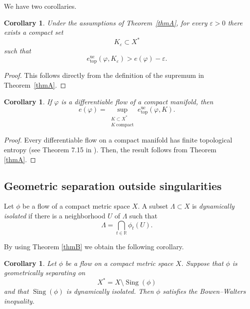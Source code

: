 \documentclass[11pt,reqno]{amsart}
\newtheorem{corollary}[theorem]{Corollary}
\theoremstyle{definition}
\theoremstyle{remark}
\newcommand{\Sing}{\operatorname{Sing}}
\newcommand{\hE}{e^{\mathrm{uc}}_{\mathrm{top}}}
\begin{document}
We have two corollaries.

\begin{corollary}
Under the assumptions of Theorem~\ref{thmA}, for every
$\varepsilon>0$ there exists a compact set
\[
K_\varepsilon\subset X^*
\]
such that
\[
\hE(\varphi,K_\varepsilon)
>
e(\varphi)-\varepsilon.
\]
\end{corollary}

\begin{proof}
This follows directly from the definition of the supremum in
Theorem~\ref{thmA}.
\end{proof}


\begin{corollary}
If $\varphi$ is a differentiable flow of a compact manifold,
then
\[
e(\varphi)
=
\sup_{\substack{K\subset X^*\\K\ \mathrm{compact}}}
\hE(\varphi,K).
\]
\end{corollary}


\begin{proof}
Every diﬀerentiable flow on a compact manifold has finite topological entropy (see Theorem 7.15 in \cite{w}). Then, the result follows from Theorem \ref{thmA}.
\end{proof}



\subsection{Geometric separation outside singularities}
Let $\phi$ be a flow of a compact metric space $X$.
A subset $\Lambda\subset X$ is {\em dynamically isolated} if there is a neighborhood $U$ of $\Lambda$ such that
\begin{equation}
\label{beixo}
\Lambda=\bigcap_{t\in\mathbb{R}}\phi_t(U).
\end{equation}

By using Theorem \ref{thmB} we obtain the following corollary.



\begin{corollary}
\label{thm:A}
Let $\phi$ be a flow on a compact metric space $X$. Suppose that
$\phi$ is geometrically separating on
\[
X^*=X\setminus\Sing(\phi)
\]
and that $\Sing(\phi)$ is dynamically isolated. Then $\phi$ satisfies
the Bowen--Walters inequality.
\end{corollary}
\end{document}
